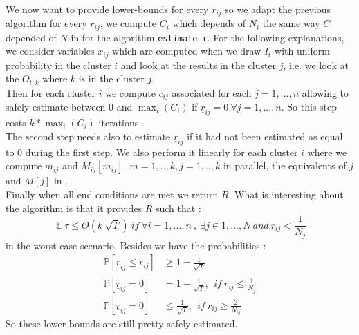 \documentclass[11pt,a4paper]{article}
\DeclareMathOperator*{\expect}{\mathbb{E}}
\begin{document}
\paragraph{}We now want to provide lower-bounds for every $r_{ij}$ so we adapt the previous algorithm for every $r_{ij}$, we compute $C_i$ which depends of $N_i$ the same way $C$ depended of $N$ in \cite{valko} for the algorithm \verb|estimate r|. For the following explanations, we consider variables $x_{ij}$ which are computed when we draw $I_t$ with uniform probability in the cluster $i$ and look at the results in the cluster $j$, i.e. we look at the $O_{t,k}$ where $k$ is in the cluster $j$.\\
Then for each cluster $i$ we compute $c_{ij}$ associated for each $j=1,...,n$ allowing to safely estimate between $0$ and $\max_i (C_i)$ if $\underline{r}_{ij}=0\ \forall j=1,...,n$. So this step costs $k* \max_i (C_i)$ iterations. \\
The second step needs also to estimate $\underline{r}_{ij}$ if it had not been estimated as equal to $0$ during the first step. We also perform it linearly for each cluster $i$ where we compute $m_{ij}$ and $M_{ij}[m_{ij}],\ m=1,..,k, j=1,..,k$ in parallel, the equivalents of $j$ and $M[j]$ in \cite{valko}.\\
Finally when all end conditions are met we return $\underline{R}$. What is interesting about the algorithm is that it provides $\underline{R}$ such that :
$$ \expect{\tau} \leq O \left( k\:\sqrt{T} \right)\ if\ \forall i=1,...,n\  ,\ \exists j\in {1,...,N}\ and\ r_{ij}<\frac{1}{N_j}  $$
in the worst case scenario. Besides we have the probabilities :
\begin{align*}
\mathbb{P} [\underline{r}_{ij} \leq r_{ij}]&\geq 1-\frac{1}{\sqrt{T}}\\
\mathbb{P} [\underline{r}_{ij}=0]&=1-\frac{1}{\sqrt{T}},\ \ if\ r_{ij}\leq \frac{1}{N_j}\\
\mathbb{P} [\underline{r}_{ij}=0]&\leq \frac{1}{\sqrt{T}},\ \ if\ r_{ij}\geq \frac{2}{N_{ij}}
\end{align*}
So these lower bounds are still pretty safely estimated. 
\end{document}
